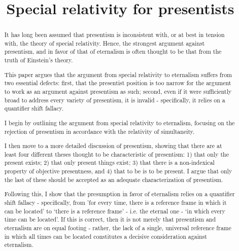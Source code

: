 \documentclass[]{article}
\title{Special relativity for presentists}
\author{}
\begin{document}
\maketitle

\begin{abstract}
It has long been assumed that presentism is inconsistent with, or at best in tension with, the theory of special relativity. Hence, the strongest argument against presentism, and in favor of that of eternalism is often thought to be that from the truth of Einstein's theory. 

This paper argues that the argument from special relativity to eternalism suffers from two essential defects: first, that the presentist position is too narrow for the argument to work as an argument against presentism as such; second, even if it were sufficiently broad to address every variety of presentism, it is invalid - specifically, it relies on a quantifier shift fallacy. 

I begin by outlining the argument from special relativity to eternalism, focusing on the rejection of presentism in accordance with the relativity of simultaneity. 

I then move to a more detailed discussion of presentism, showing that there are at least four different theses thought to be characteristic of presentism: 1) that only the present exists; 2) that only present things exist; 3) that there is a non-indexical property of objective presentness, and 4) that to be is to be present. I argue that only the last of these should be accepted as an adequate characterization of presentism. 

Following this, I show that the presumption in favor of eternalism relies on a quantifier shift fallacy - specifically, from 'for every time, there is a reference frame in which it can be located' to `there is a reference frame' - i.e. the eternal one - `in which every time can be located'. If this is correct, then it is not merely that presentism and eternalism are on equal footing - rather, the lack of a single, universal reference frame in which all times can be located constitutes a decisive consideration against eternalism. 
\end{abstract}
\end{document}
